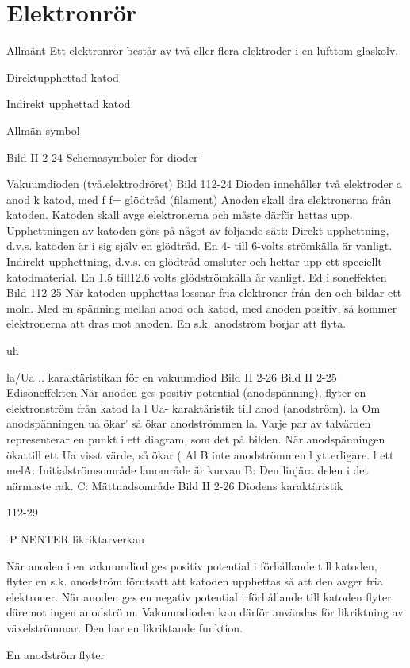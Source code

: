 \section{Elektronrör}
Allmänt
Ett elektronrör består av två eller flera elektroder i en lufttom glaskolv.

Direktupphettad
katod

Indirekt upphettad katod

Allmän
symbol

Bild II 2-24 Schemasymboler för dioder

Vakuumdioden (två.elektrodröret)
Bild 112-24
Dioden innehåller två elektroder
a anod
k katod, med f f= glödtråd (filament)
Anoden skall dra elektronerna från katoden.
Katoden skall avge elektronerna och måste
därför hettas upp.
Upphettningen av katoden görs på något
av följande sätt:
Direkt upphettning, d.v.s. katoden är i sig
själv en glödtråd. En 4- till 6-volts strömkälla
är vanligt.
Indirekt upphettning, d.v.s. en glödtråd
omsluter och hettar upp ett speciellt katodmaterial. En 1.5 till12.6 volts glödströmkälla
är vanligt.
Ed i soneffekten
Bild 112-25
När katoden upphettas lossnar fria elektroner från den och bildar ett moln. Med en
spänning mellan anod och katod, med
anoden positiv, så kommer elektronerna att
dras mot anoden. En s.k. anodström börjar
att flyta.

uh

la/Ua .. karaktäristikan för en vakuumdiod
Bild II 2-26
Bild II 2-25 Edisoneffekten
När anoden ges positiv potential (anodspänning), flyter en elektronström från katod
la l Ua- karaktäristik
till anod (anodström).
la
Om anodspänningen
ua ökar' så ökar anodströmmen la. Varje
par av talvärden representerar en punkt
i ett diagram, som det
på bilden. När anodspänningen ökattill ett
Ua
visst värde, så ökar
(
Al B
inte anodströmmen
l
ytterligare.
l ett melA: Initialströmsområde
lanområde är kurvan
B: Den linjära delen
i det närmaste rak.
C: Mättnadsområde
Bild II 2-26 Diodens karaktäristik

112-29

P NENTER
likriktarverkan

När anoden i en vakuumdiod ges positiv
potential i förhållande till katoden, flyter en
s.k. anodström förutsatt att katoden upphettas så att den avger fria elektroner.
När anoden ges en negativ potential i
förhållande till katoden flyter däremot ingen
anodströ m.
Vakuumdioden kan därför användas för
likriktning av växelströmmar. Den har en
likriktande funktion.

En anodström flyter

